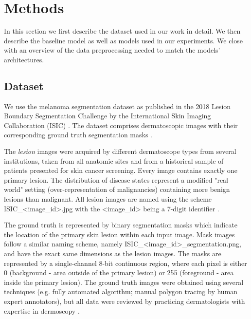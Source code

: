 \section{Methods}
In this section we first describe the dataset used in our work in detail. We then describe the baseline model as well as models used in our experiments. We close with an overview of the data preprocessing needed to match the models’ architectures.

\subsection{Dataset}
\label{dataset}
We use the melanoma segmentation dataset as published in the 2018 Lesion Boundary Segmentation Challenge by the International Skin Imaging Collaboration (ISIC) \citep{isic-2018-segmentation}. The dataset comprises dermatoscopic images with their corresponding ground truth segmentation masks \citep{ensambles-2016-codella}.

\par
The \emph{lesion} images were acquired by different dermatoscope types from several institutions, taken from all anatomic sites and from a historical sample of patients presented for skin cancer screening. Every image contains exactly one primary lesion. The distribution of disease states represent a modified "real world" setting (over-representation of malignancies) containing more benign lesions than malignant. All lesion images are named using the scheme ISIC\_\textless{image}\_id\textgreater{.jpg} with the \textless{image}\_id\textgreater{} being a 7-digit identifier \citep{isic-2018-segmentation}.

\par
The ground truth is represented by binary segmentation masks which indicate the location of the primary skin lesion within each input image. Mask images follow a similar naming scheme, namely  ISIC\_\textless{image\_id}\textgreater{\_segmentation.png}, and have the exact same dimensions as the lesion images. The masks are represented by a single-channel 8-bit continuous region, where each pixel is either 0 (background - area outside of the primary lesion) or 255 (foreground - area inside the primary lesion). The ground truth images were obtained using several techniques (e.g. fully automated algorithm; manual polygon tracing by human expert annotators), but all data were reviewed by practicing dermatologists with expertise in dermoscopy \citep{isic-2018-segmentation,ensambles-2016-codella}.

